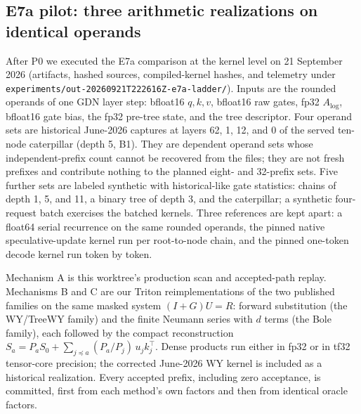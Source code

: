 \documentclass[conference]{IEEEtran}
\begin{document}
\subsection{E7a pilot: three arithmetic realizations on identical operands}
\label{sec:e7a-pilot}
After P0 we executed the E7a comparison at the kernel level on 21 September 2026 (artifacts, hashed sources, compiled-kernel hashes, and telemetry under \texttt{experiments/out-20260921T222616Z-e7a-ladder/}). Inputs are the rounded operands of one GDN layer step: bfloat16 $q,k,v$, bfloat16 raw gates, fp32 $A_{\log}$, bfloat16 gate bias, the fp32 pre-tree state, and the tree descriptor. Four operand sets are historical June-2026 captures at layers 62, 1, 12, and 0 of the served ten-node caterpillar (depth 5, B1). They are dependent operand sets whose independent-prefix count cannot be recovered from the files; they are not fresh prefixes and contribute nothing to the planned eight- and 32-prefix sets. Five further sets are labeled synthetic with historical-like gate statistics: chains of depth 1, 5, and 11, a binary tree of depth 3, and the caterpillar; a synthetic four-request batch exercises the batched kernels. Three references are kept apart: a float64 serial recurrence on the same rounded operands, the pinned native speculative-update kernel run per root-to-node chain, and the pinned one-token decode kernel run token by token.

Mechanism A is this worktree's production scan and accepted-path replay. Mechanisms B and C are our Triton reimplementations of the two published families on the same masked system $(I+G)U=R$: forward substitution (the WY/TreeWY family) and the finite Neumann series with $d$ terms (the Bole family), each followed by the compact reconstruction $S_a=P_aS_0+\sum_{j\preceq a}(P_a/P_j)\,u_jk_j^\top$. Dense products run either in fp32 or in tf32 tensor-core precision; the corrected June-2026 WY kernel is included as a historical realization. Every accepted prefix, including zero acceptance, is committed, first from each method's own factors and then from identical oracle factors.
\end{document}
